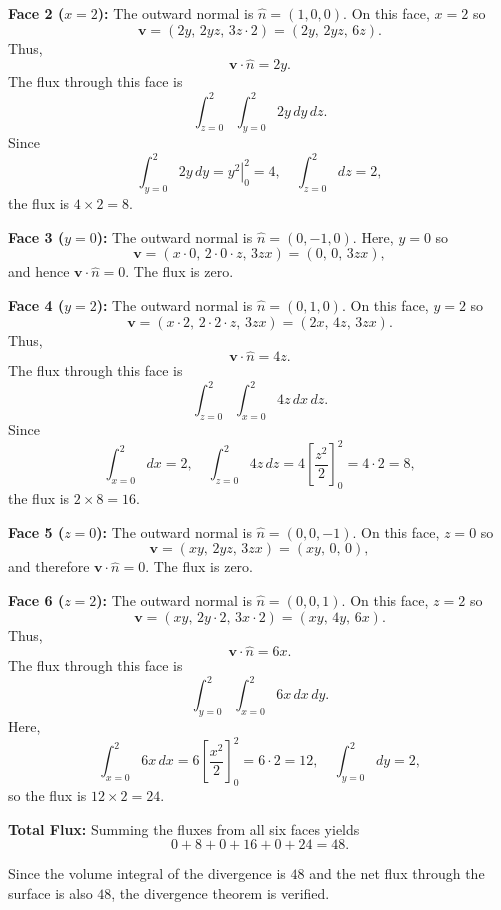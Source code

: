 \begin{hwkProblem}{1.33}{}
	\textbf{Face 2 (\(x=2\)):}  
	The outward normal is \(\hat{n} = (1,0,0)\). On this face, \(x=2\) so
	\[
		\mathbf{v} = (2y,\,2yz,\,3z\cdot2) = (2y,\,2yz,\,6z).
	\]
	Thus,
	\[
		\mathbf{v}\cdot\hat{n} = 2y.
	\]
	The flux through this face is
	\[
		\int_{z=0}^{2}\int_{y=0}^{2} 2y\,dy\,dz.
	\]
	Since
	\[
		\int_{y=0}^{2} 2y\,dy = \left. y^2\right|_0^2 = 4,\quad \int_{z=0}^{2}dz = 2,
	\]
	the flux is \(4\times 2 = 8\).

	\textbf{Face 3 (\(y=0\)):}  
	The outward normal is \(\hat{n} = (0,-1,0)\). Here, \(y=0\) so
	\[
		\mathbf{v} = (x\cdot0,\,2\cdot0\cdot z,\,3zx) = (0,\,0,\,3zx),
	\]
	and hence \(\mathbf{v}\cdot\hat{n} = 0\). The flux is zero.

	\textbf{Face 4 (\(y=2\)):}  
	The outward normal is \(\hat{n} = (0,1,0)\). On this face, \(y=2\) so
	\[
		\mathbf{v} = (x\cdot2,\,2\cdot2\cdot z,\,3zx) = (2x,\,4z,\,3zx).
	\]
	Thus,
	\[
		\mathbf{v}\cdot\hat{n} = 4z.
	\]
	The flux through this face is
	\[
		\int_{z=0}^{2}\int_{x=0}^{2} 4z\,dx\,dz.
	\]
	Since
	\[
		\int_{x=0}^{2}dx = 2,\quad \int_{z=0}^{2} 4z\,dz = 4\left[\frac{z^2}{2}\right]_0^2 = 4\cdot 2 = 8,
	\]
	the flux is \(2\times 8 = 16\).

	\textbf{Face 5 (\(z=0\)):}  
	The outward normal is \(\hat{n} = (0,0,-1)\). On this face, \(z=0\) so
	\[
		\mathbf{v} = (xy,\,2yz,\,3zx) = (xy,\,0,\,0),
	\]
	and therefore \(\mathbf{v}\cdot\hat{n} = 0\). The flux is zero.

	\textbf{Face 6 (\(z=2\)):}  
	The outward normal is \(\hat{n} = (0,0,1)\). On this face, \(z=2\) so
	\[
		\mathbf{v} = (xy,\,2y\cdot2,\,3x\cdot2) = (xy,\,4y,\,6x).
	\]
	Thus,
	\[
		\mathbf{v}\cdot\hat{n} = 6x.
	\]
	The flux through this face is
	\[
		\int_{y=0}^{2}\int_{x=0}^{2} 6x\,dx\,dy.
	\]
	Here,
	\[
		\int_{x=0}^{2} 6x\,dx = 6\left[\frac{x^2}{2}\right]_0^2 = 6\cdot 2 = 12,\quad \int_{y=0}^{2} dy = 2,
	\]
	so the flux is \(12\times 2 = 24\).

	\textbf{Total Flux:}  
	Summing the fluxes from all six faces yields
	\[
		0 + 8 + 0 + 16 + 0 + 24 = 48.
	\]

	Since the volume integral of the divergence is \(48\) and the net flux through the surface is also \(48\), the divergence theorem is verified.

\end{hwkProblem}

